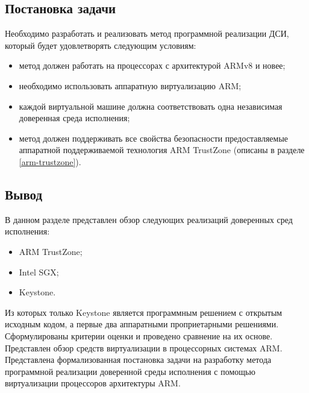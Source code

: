 \subsection{Постановка задачи}

Необходимо разработать и реализовать метод программной реализации ДСИ, который будет удовлетворять следующим условиям:

\begin{itemize}
	\item метод должен работать на процессорах с архитектурой ARMv8 и новее;
	\item необходимо использовать аппаратную виртуализацию ARM;
	\item каждой виртуальной машине должна соответствовать одна независимая доверенная среда исполнения;
	\item метод должен поддерживать все свойства безопасности предоставляемые аппаратной поддерживаемой технология ARM TrustZone (описаны в разделе \ref{arm-trustzone}).
\end{itemize}

\subsection*{Вывод}

В данном разделе представлен обзор следующих реализаций доверенных сред исполнения:

\begin{itemize}
	\item ARM TrustZone;
	\item Intel SGX;
	\item Keystone.
\end{itemize}

Из которых только Keystone является программным решением с открытым исходным кодом, а первые два аппаратными проприетарными решениями.
Сформулированы критерии оценки и проведено сравнение на их основе. Представлен обзор средств виртуализации в процессорных системах ARM. Представлена формализованная постановка задачи на разработку метода программной реализации доверенной среды исполнения с помощью виртуализации процессоров архитектуры ARM.

\pagebreak
